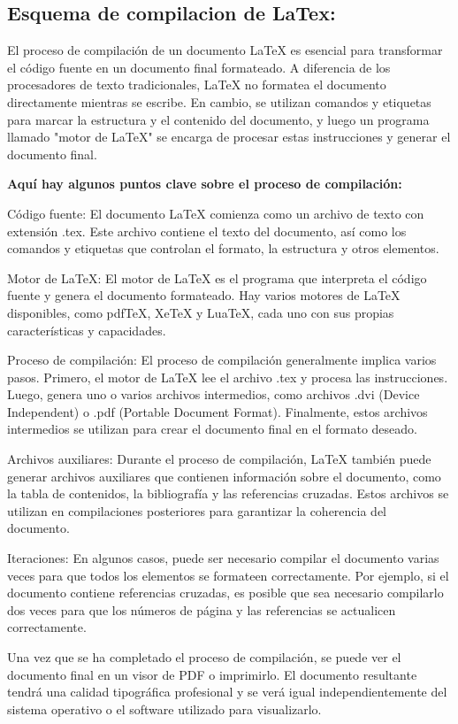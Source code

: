 \documentclass[10pt,twocolumn,a4paper]{article}
\begin{document}
    \subsection{Esquema de compilacion de LaTex:}
    El proceso de compilación de un documento LaTeX es esencial para transformar el código fuente en un documento final formateado. 
    A diferencia de los procesadores de texto tradicionales, LaTeX no formatea el documento directamente mientras se escribe. 
    En cambio, se utilizan comandos y etiquetas para marcar la estructura y el contenido del documento, y luego un programa llamado "motor de LaTeX" se encarga de procesar estas instrucciones y generar el documento final.
    
    \textbf{Aquí hay algunos puntos clave sobre el proceso de compilación:}

    Código fuente: El documento LaTeX comienza como un archivo de texto con extensión .tex. Este archivo contiene el texto del documento, así como los comandos y etiquetas que controlan el formato, la estructura y otros elementos.

    Motor de LaTeX: El motor de LaTeX es el programa que interpreta el código fuente y genera el documento formateado. Hay varios motores de LaTeX disponibles, como pdfTeX, XeTeX y LuaTeX, cada uno con sus propias características y capacidades.

    Proceso de compilación: El proceso de compilación generalmente implica varios pasos. Primero, el motor de LaTeX lee el archivo .tex y procesa las instrucciones. Luego, genera uno o varios archivos intermedios, como archivos .dvi (Device Independent) o .pdf (Portable Document Format). Finalmente, estos archivos intermedios se utilizan para crear el documento final en el formato deseado.

    Archivos auxiliares: Durante el proceso de compilación, LaTeX también puede generar archivos auxiliares que contienen información sobre el documento, como la tabla de contenidos, la bibliografía y las referencias cruzadas. Estos archivos se utilizan en compilaciones posteriores para garantizar la coherencia del documento.

    Iteraciones: En algunos casos, puede ser necesario compilar el documento varias veces para que todos los elementos se formateen correctamente. Por ejemplo, si el documento contiene referencias cruzadas, es posible que sea necesario compilarlo dos veces para que los números de página y las referencias se actualicen correctamente.

    Una vez que se ha completado el proceso de compilación, se puede ver el documento final en un visor de PDF o imprimirlo. El documento resultante tendrá una calidad tipográfica profesional y se verá igual independientemente del sistema operativo o el software utilizado para visualizarlo.
\end{document}
